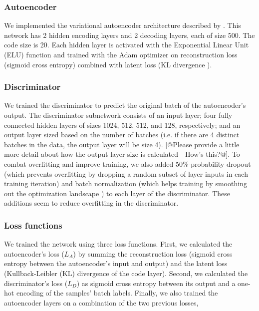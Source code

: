 \documentclass[11pt]{article}
\begin{document}
\subsubsection{Autoencoder}

We implemented the variational autoencoder architecture \citep{louizos_variational_2015} described by \citet[Chapter 15]{geron_hands-machine_2017}.
This network has 2 hidden encoding layers and 2 decoding layers, each of size 500.
The code size is 20.
Each hidden layer is activated with the Exponential Linear Unit (ELU) function \citep{clevert_fast_2015} and trained with the Adam optimizer \citep{kingma_adam_2014} on reconstruction loss (sigmoid cross entropy) combined with latent loss (KL divergence \citep{kullback_information_1951}).

\subsubsection{Discriminator}

We trained the discriminator to predict the original batch of the autoencoder's output.
The discriminator subnetwork consists of an input layer; four fully connected hidden layers of sizes 1024, 512, 512, and 128, respectively; and an output layer sized based on the number of batches (i.e. if there are 4 distinct batches in the data, the output layer will be size 4). [@Please provide a little more detail about how the output layer size is calculated - How's this?@].
To combat overfitting and improve training, we also added 50\%-probability dropout \cite{srivastava_dropout_2014} (which prevents overfitting by dropping a random subset of layer inputs in each training iteration) and batch normalization \cite{ioffe_batch_2015} (which helps training by smoothing out the optimization landscape \citep{santurkar_how_2018}) to each layer of the discriminator.
These additions seem to reduce overfitting in the discriminator.

\subsubsection{Loss functions}

We trained the network using three loss functions.
First, we calculated the autoencoder's loss ($L_A$) by summing the reconstruction loss (sigmoid cross entropy between the autoencoder's input and output) and the latent loss (Kullback-Leibler (KL) divergence \cite{kullback_information_1951} of the code layer).
Second, we calculated the discriminator's loss ($L_D$) as sigmoid cross entropy between its output and a one-hot encoding of the samples' batch labels.
Finally, we also trained the autoencoder layers on a combination of the two previous losses,
\end{document}
